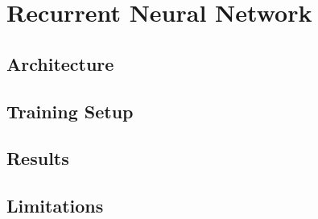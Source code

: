 \section{Recurrent Neural Network}
\label{sec:rnn}


\subsection{Architecture}

%

\subsection{Training Setup}


\subsection{Results}




\subsection{Limitations}

%
